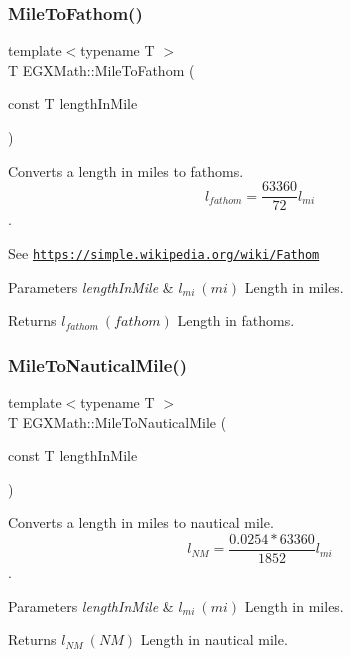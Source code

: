\subsubsection{\texorpdfstring{Mile\+To\+Fathom()}{MileToFathom()}}
{\footnotesize\ttfamily template$<$typename T $>$ \\
T E\+G\+X\+Math\+::\+Mile\+To\+Fathom (\begin{DoxyParamCaption}\item[{const T}]{length\+In\+Mile }\end{DoxyParamCaption})}



Converts a length in miles to fathoms. \[ l_{fathom}= \frac{63360}{72} l_{mi} \]. 

See \href{https://simple.wikipedia.org/wiki/Fathom}{\tt https\+://simple.\+wikipedia.\+org/wiki/\+Fathom} 
\begin{DoxyParams}{Parameters}
{\em length\+In\+Mile} & $ l_{mi}\ (mi)$ Length in miles. \\
\hline
\end{DoxyParams}
\begin{DoxyReturn}{Returns}
$ l_{fathom}\ (fathom)$ Length in fathoms. 
\end{DoxyReturn}
\mbox{\label{group___e_g_x_math-_conversions-_length_conversions-_imperial-_mile-_nautical_ga1f50d3e2d321bf020c3027501a2a5421}} 
\subsubsection{\texorpdfstring{Mile\+To\+Nautical\+Mile()}{MileToNauticalMile()}}
{\footnotesize\ttfamily template$<$typename T $>$ \\
T E\+G\+X\+Math\+::\+Mile\+To\+Nautical\+Mile (\begin{DoxyParamCaption}\item[{const T}]{length\+In\+Mile }\end{DoxyParamCaption})}



Converts a length in miles to nautical mile. \[ l_{NM}= \frac{0.0254 * 63360}{1852} l_{mi} \]. 


\begin{DoxyParams}{Parameters}
{\em length\+In\+Mile} & $ l_{mi}\ (mi)$ Length in miles. \\
\hline
\end{DoxyParams}
\begin{DoxyReturn}{Returns}
$ l_{NM}\ (NM)$ Length in nautical mile. 
\end{DoxyReturn}
